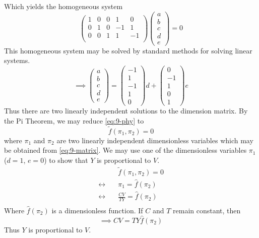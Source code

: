 \documentclass[12pt]{article}
\begin{document}
  Which yields the homogeneous system
  \begin{equation*}
    \begin{pmatrix}
      1 & 0 & 0 & 1 & 0 \\
      0 & 1 & 0 & -1 & 1 \\
      0 & 0 & 1 & 1 & -1 \\
    \end{pmatrix}
    \begin{pmatrix}
      a \\ b \\ c \\ d \\ e
    \end{pmatrix} = 0
  \end{equation*}
  This homogeneous system may be solved by standard methods for solving linear
  systems.
  \begin{equation}
    \label{eq:9-matrix}
    \implies
    \begin{pmatrix}
      a \\ b \\ c \\ d \\ e
    \end{pmatrix}
    =
    \begin{pmatrix}
      -1 \\ 1 \\ -1 \\ 1 \\ 0
    \end{pmatrix}d +
    \begin{pmatrix}
      0 \\ -1 \\ 1 \\ 0 \\ 1
    \end{pmatrix}e
  \end{equation}
  Thus there are two linearly independent solutions to the dimension matrix.
  By the Pi Theorem, we may reduce \cref{eq:9-phy} to
  \begin{equation}
    \tilde{f}(\pi_1, \pi_2) = 0
  \end{equation}
  where $\pi_1$ and $\pi_2$ are two linearly independent dimensionless variables
  which may be obtained from \cref{eq:9-matrix}. We may use one of the
  dimensionless variables $\pi_1$ ($d=1$, $e=0$) to show that $Y$ is
  proportional to $V$.
  \begin{equation*}
    \begin{aligned}
      &\tilde{f}(\pi_1,\pi_2)= 0 \\
      \leftrightarrow\quad& \pi_1 = \hat{f}(\pi_2) \\
      \leftrightarrow\quad& \frac{CV}{TY} = \hat{f}(\pi_2) \\
    \end{aligned}
  \end{equation*}
  Where $\hat{f}(\pi_2)$ is a dimensionless function. If $C$ and $T$ remain
  constant, then
  \begin{equation}
    \label{eq:9-prop}
    \boxed{
      \implies CV = TY\hat{f}(\pi_2)
    }
  \end{equation}
  Thus $Y$ is proportional to $V$.
\end{document}

